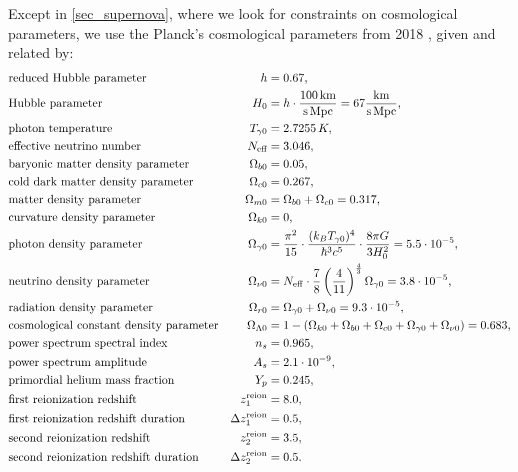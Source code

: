 \documentclass[10pt,a4paper]{article}
\begin{document}
Except in \cref{sec_supernova}, where we look for constraints on cosmological parameters, we use the Planck's cosmological parameters from 2018 \cite{planckcollaborationPlanck2018Results2020},
given and related by:
\begin{equation}
\begin{aligned}
	& \text{reduced Hubble parameter} & h &= 0.67, \\
	& \text{Hubble parameter} & H_0 &= h \cdot \frac{100\,\mathrm{km}}{\mathrm{s}\,\mathrm{Mpc}} = 67 \frac{\mathrm{km}}{\mathrm{s}\,\mathrm{Mpc}}, \\
	& \text{photon temperature} & T_{\gamma0} &= 2.7255\,K, \\
	& \text{effective neutrino number} & N_\text{eff} &= 3.046, \\
	& \text{baryonic matter density parameter} & \Omega_{b0} &= 0.05, \\
	& \text{cold dark matter density parameter} & \Omega_{c0} &= 0.267,\\
	& \text{matter density parameter} & \Omega_{m0} &= \Omega_{b0} + \Omega_{c0} = 0.317, \\
	& \text{curvature density parameter} & \Omega_{k0} &= 0, \\
	& \text{photon density parameter} & \Omega_{\gamma0} &= \frac{\pi^2}{15} \cdot \frac{(k_B T_{\gamma0})^4}{\hbar^3 c^5} \cdot \frac{8 \pi G}{3 H_0^2} = 5.5 \cdot 10^{-5} , \\
	& \text{neutrino density parameter} & \Omega_{\nu0} &= N_{\rm eff}\cdot \frac{7}{8}\left(\frac{4}{11}\right)^{\frac43}\Omega_{\gamma 0} = 3.8 \cdot 10^{-5} , \\
	& \text{radiation density parameter} & \Omega_{r0} &= \Omega_{\gamma0} + \Omega_{\nu0} = 9.3 \cdot 10^{-5}, \\
	& \text{cosmological constant density parameter} & \Omega_{\Lambda 0} &= 1 - (\Omega_{k 0}+\Omega_{b 0}+\Omega_{c0}+\Omega_{\gamma 0}+\Omega_{\nu 0}) = 0.683,\\
	& \text{power spectrum spectral index} & n_s &= 0.965, \\
	& \text{power spectrum amplitude} & A_s &= 2.1\cdot 10^{-9}, \\
	& \text{primordial helium mass fraction} & Y_p &= 0.245, \\
	& \text{first reionization redshift} & z^{\rm reion}_1 &= 8.0, \\
	& \text{first reionization redshift duration} & \Delta z^{\rm reion}_1 &= 0.5, \\
	& \text{second reionization redshift} & z^{\rm reion}_2 &= 3.5, \\
	& \text{second reionization redshift duration} & \Delta z^{\rm reion}_2 &= 0.5.
\end{aligned}
\label{eq_planck2018}
\end{equation}
\end{document}
